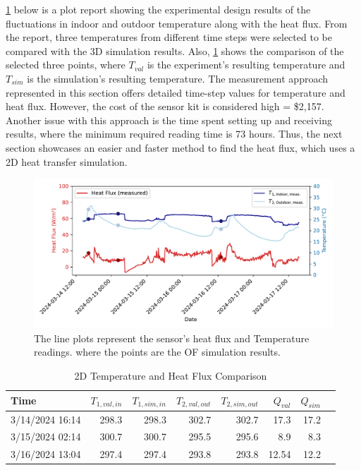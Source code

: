 \ref{fig:expr} below is a plot report showing the experimental design results of the fluctuations in indoor and outdoor temperature along with the heat flux. From the report, three temperatures from different time steps were selected to be compared with the 3D simulation results. Also, \ref{table2d} shows the comparison of the selected three points, where $T_{val}$ is the experiment's resulting temperature and $T_{sim}$ is the simulation's resulting temperature. 
The measurement approach represented in this section offers detailed time-step values for temperature and heat flux. However, the cost of the sensor kit is considered high = \$2,157. Another issue with this approach is the time spent setting up and receiving results, where the minimum required reading time is 73 hours. Thus, the next section showcases an easier and faster method to find the heat flux, which uses a 2D heat transfer simulation.

\begin{figure}[htb]
     \centering
    \includegraphics[width=1\linewidth]{Figures/Validation}
     \caption[2D Experimental Report Plot]{The line plots represent the sensor's heat flux and Temperature readings. where the points are the \gls{OF} simulation results.}
   \label{fig:expr}
 \end{figure}


\begin{table}[tbh]
    \caption{2D Temperature and Heat Flux Comparison}
    \label{table2d}
    \centering
    \begin{tabular}{lrrrrrrr}
        \toprule
        Time                & $T_{1,val,in}$ & $T_{1,sim,in}$ & $T_{2,val,out}$& $T_{2,sim,out}$ & $Q_{val}$ & $Q_{sim}$ \\
        \midrule
        3/14/2024 16:14 & 298.3    & 298.3    & 302.7     & 302.7     & 17.3 & 17.2 \\
        3/15/2024 02:14  & 300.7    & 300.7   & 295.5    & 295.6     & 8.9  & 8.3  \\
        3/16/2024 13:04 & 297.4  & 297.4   & 293.8   & 293.8   & 12.54 & 12.2  \\
        \bottomrule
    \end{tabular}
   
\end{table}





